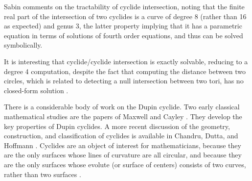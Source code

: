 
\begin{rmk}
Sabin \cite{Sabin89} comments on the tractability of cyclide intersection,
noting that the finite real part of the intersection of 
two cyclides is a curve 
of degree 8 (rather than 16 as expected) and genus 3, 
the latter property implying that it has a 
parametric equation in terms of solutions of fourth order equations, 
and thus can be solved symbolically.


It is interesting that cyclide/cyclide intersection is exactly
solvable, reducing to a degree 4 computation, despite the fact that
computing the distance between two circles, which is related to 
detecting a null intersection between two tori, has no closed-form
solution \cite{neff90}.
\end{rmk}




There is a considerable body of work on the Dupin cyclide.
Two early classical mathematical studies are the papers 
of Maxwell \cite{MAX68} and Cayley \cite{CAY96}.
They develop the key properties of Dupin cyclides.
%
A more recent discussion of the 
geometry, construction, and classification of cyclides is
available in Chandru, Dutta, and Hoffmann \cite{CDH89a}.
Cyclides are an object of interest for mathematicians,
because they are the only surfaces whose lines of curvature are all circular,
and because they are the only surfaces whose evolute (or surface of centers)
consists of two curves, rather than two surfaces \cite{H52}.


